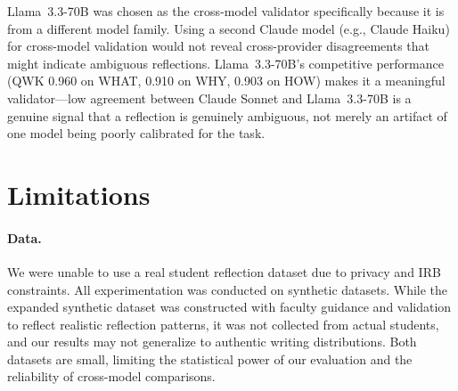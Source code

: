 \documentclass[11pt]{article}
\begin{document}
Llama~3.3-70B was chosen as the cross-model validator specifically because it is from a different model family. Using a second Claude model (e.g., Claude Haiku) for cross-model validation would not reveal cross-provider disagreements that might indicate ambiguous reflections. Llama~3.3-70B's competitive performance (QWK 0.960 on WHAT, 0.910 on WHY, 0.903 on HOW) makes it a meaningful validator—low agreement between Claude Sonnet and Llama~3.3-70B is a genuine signal that a reflection is genuinely ambiguous, not merely an artifact of one model being poorly calibrated for the task.




\section{Limitations}
\label{sec:limitations}
\paragraph{Data.}
We were unable to use a real student reflection dataset due to privacy and IRB constraints. All experimentation was conducted on synthetic datasets. While the expanded synthetic dataset was constructed with faculty guidance and validation to reflect realistic reflection patterns, it was not collected from actual students, and our results may not generalize to authentic writing distributions. Both datasets are small, limiting the statistical power of our evaluation and the reliability of cross-model comparisons.
\end{document}
